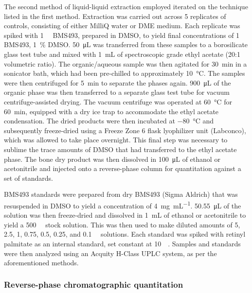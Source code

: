 \begin{refsection}
The second method of liquid-liquid extraction employed iterated on the technique
listed in the first method. Extraction was carried out across 5 replicates of
controls, consisting of either MilliQ water or DME medium. Each replicate was
spiked with \SI{1}{\milli\moLar} BMS493, prepared in DMSO, to yield final
concentrations of \SI{1}{\micro\moLar} BMS493, \SI{1}{\percent} DMSO.
\SI{50}{\uL} was transferred from these samples to a borosilicate glass test
tube and mixed with \SI{1}{\mL} of spectroscopic grade ethyl acetate (20:1
volumetric ratio). The organic/aqueous sample was then agitated for
\SI{30}{\minute} in a sonicator bath, which had been pre-chilled to
approximately \SI{10}{\celsius}. The samples were then centrifuged for
\SI{5}{\minute} to separate the phases again. \SI{900}{\uL} of the organic phase
was then transferred to a separate glass test tube for vacuum
centrifuge-assisted drying.  The vacuum centrifuge was operated at
\SI{60}{\celsius} for \SI{60}{\minute}, equipped with a dry ice trap to
accommodate the  ethyl acetate condensation. The dried products were then
incubated at \SI{-80}{\celsius} and subsequently freeze-dried using a Freeze
Zone 6 flask lyophilizer unit (Labconco), which was allowed to take place
overnight. This final step was necessary to sublime the trace amounts of DMSO
that had transferred to the ethyl acetate phase. The bone dry product was then
dissolved in \SI{100}{\uL} of ethanol or acetonitrile and injected onto a
 reverse-phase column for quantitation against a set of standards.

BMS493 standards were prepared from dry BMS493 (Sigma Aldrich) that was
resuspended in DMSO to yield a concentration of \SI{4}{\mg\per\mL}.
\SI{50.55}{\uL} of the solution was then freeze-dried and dissolved in
\SI{1}{\mL} of ethanol or acetonitrile to yield a \SI{500}{\micro\moLar} stock
solution. This was then used to make diluted amounts of 5, 2.5, 1, 0.75, 0.5,
0.25, and \SI{0.1}{\micro\moLar} solutions. Each standard was spiked with retinyl
palmitate as an internal standard, set constant at \SI{10}{\micro\moLar}.
Samples and standards were then analyzed using an Acquity H-Class UPLC system,
as per the aforementioned methods.

\subsubsection{Reverse-phase chromatographic quantitation}


\end{refsection}
